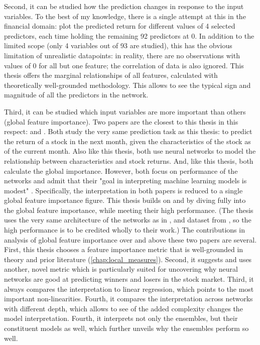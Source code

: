 			Second, it can be studied how the prediction changes in response to the input variables. To the best of my knowledge, there is a single attempt at this in the financial domain: \cite{gu2020empirical} plot the predicted return for different values of 4 selected predictors, each time holding the remaining 92 predictors at 0. In addition to the limited scope (only 4 variables out of 93 are studied), this has the obvious limitation of unrealistic datapoints: in reality, there are no observations with values of 0 for all but one feature; the correlation of data is also ignored. This thesis offers the marginal relationships of all features, calculated with theoretically well-grounded methodology. This allows to see the typical sign and magnitude of all the predictors in the network.
			
			Third, it can be studied which input variables are more important than others (global feature importance). Two papers are the closest to this thesis in this respect: \cite{gu2020empirical} and \cite{tobek2020does}. Both study the very same prediction task as this thesis: to predict the return of a stock in the next month, given the characteristics of the stock as of the current month. Also like this thesis, both use neural networks to model the relationship between characteristics and stock returns. And, like this thesis, both calculate the global importance. However, both focus on performance of the networks and admit that their "goal in interpreting machine learning models is modest" \cite[p.~2247]{gu2020empirical}. Specifically, the interpretation in both papers is reduced to a single global feature importance figure. This thesis builds on \cite{gu2020empirical} and \cite{tobek2020does} by diving fully into the global feature importance, while meeting their high performance. (The thesis uses the very same architecture of the networks as in \cite{gu2020empirical}, and dataset from \cite{tobek2020does}, so the high performance is to be credited wholly to their work.) The contributions in analysis of global feature importance over and above these two papers are several. First, this thesis chooses a feature importance metric that is well-grounded in theory and prior literature (\ref{chap:local_measures}). Second, it suggests and uses another, novel metric which is particularly suited for uncovering why neural networks are good at predicting winners and losers in the stock market. Third, it always compares the interpretation to linear regression, which points to the most important non-linearities. Fourth, it compares the interpretation across networks with different depth, which allows to see of the added complexity changes the model interpretation. Fourth, it interprets not only the ensembles, but their constituent models as well, which further unveils why the ensembles perform so well.     		
			
